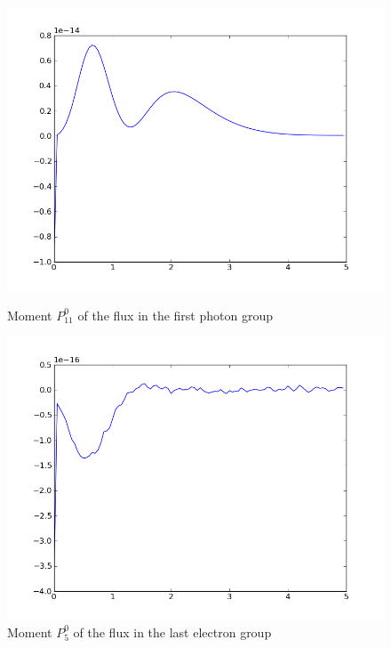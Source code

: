 \begin{figure}[H]
\begin{minipage}[b]{0.42\linewidth}
\centering
\includegraphics[width=\linewidth]{./images/al/group_0_moment_142}
\caption{Moment $P_{11}^0$ of the flux in the first photon group}
\end{minipage}
\hspace{0.5cm}
\begin{minipage}[b]{0.42\linewidth}
\centering
\includegraphics[width=\linewidth]{./images/al/group_39_moment_142}
\caption{Moment $P_5^0$ of the flux in the last electron group}
\end{minipage}
\end{figure}

